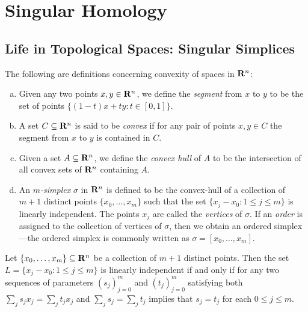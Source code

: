 \section{Singular Homology}

\subsection{Life in Topological Spaces: Singular Simplices}

\begin{definition}[Convexity]
    \label{def:convexity}
    The following are definitions concerning convexity of spaces in \(\mathbf{R}^n\):
    \begin{enumerate}[(a)]\setlength\itemsep{0em}
        \item Given any two points \(x, y \in \mathbf{R}^n\), we define the \emph{segment} from
              \(x\) to \(y\) to be the set of points
              \(\{(1-t) x + t y \colon t \in [0, 1]\}\).

        \item A set \(C \subseteq \mathbf{R}^n\) is said to be \emph{convex} if for any pair of
              points \(x, y \in C\) the segment from \(x\) to \(y\) is contained in \(C\).

        \item Given a set \(A \subseteq \mathbf{R}^n\), we define the \emph{convex hull} of
              \(A\) to be the intersection of all convex sets of \(\mathbf{R}^n\) containing \(A\).

        \item An \emph{\(m\)-simplex} \(\sigma\) in \(\mathbf{R}^n\) is defined to be the
              convex-hull of a collection of \(m+1\) distinct points \(\{x_0, \dots, x_m\}\)
              such that the set \(\{x_j - x_0 \colon 1 \leq j \leq m\}\) is linearly
              independent. The points \(x_j\) are called the \emph{vertices} of
              \(\sigma\). If an \emph{order} is assigned to the collection of vertices of
              \(\sigma\), then we obtain an ordered simplex---the ordered simplex is
              commonly written as \(\sigma = [x_0, \dots, x_m]\).
    \end{enumerate}
\end{definition}

\begin{lemma}
    \label{lem:linear-independence-simplex}
    Let \(\{x_0, \dots, x_m\} \subseteq \mathbf{R}^n\) be a collection of \(m+1\) distinct
    points. Then the set \(L = \{x_j - x_0 \colon 1 \leq j \leq m\}\) is linearly
    independent if and only if for any two sequences of parameters \((s_j)_{j=0}^m\)
    and \((t_j)_{j=0}^m\) satisfying both \(\sum_j s_j x_j = \sum_j t_j x_j\) and
    \(\sum_j s_j = \sum_j t_j\) implies that \(s_j = t_j\) for each \(0 \leq j \leq m\).
\end{lemma}


